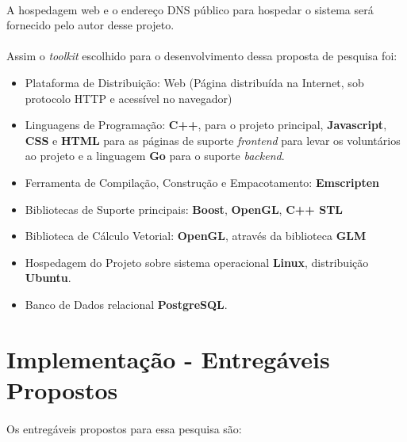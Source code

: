 \documentclass{article}
\begin{document}
	\paragraph{}
	A hospedagem web e o endereço DNS público para hospedar o sistema será fornecido pelo autor desse projeto.
	
	\paragraph{}
	Assim o \textit{toolkit} escolhido para o desenvolvimento dessa proposta de pesquisa foi:
	
	\begin{itemize}
			\item Plataforma de Distribuição: Web (Página distribuída na Internet, sob protocolo HTTP e acessível no navegador)
			\item Linguagens de Programação: \textbf{C++}, para o projeto principal, \textbf{Javascript}, \textbf{CSS} e 	\textbf{HTML} para as páginas de suporte \textit{frontend} para levar os voluntários ao projeto e a linguagem \textbf{Go} para o suporte \textit{backend}.
			\item Ferramenta de Compilação, Construção e Empacotamento: \textbf{Emscripten}
			\item Bibliotecas de Suporte principais: \textbf{Boost}, \textbf{OpenGL}, \textbf{C++ STL}
			\item Biblioteca de Cálculo Vetorial: \textbf{OpenGL}, através da biblioteca \textbf{GLM}	
			\item Hospedagem do Projeto sobre sistema operacional \textbf{Linux}, distribuição \textbf{Ubuntu}.	
			\item Banco de Dados relacional \textbf{PostgreSQL}.
	\end{itemize}
	
	\section{Implementação - Entregáveis Propostos} \label{ie}
	\paragraph{}
	Os entregáveis propostos para essa pesquisa são:
	
\end{document}
